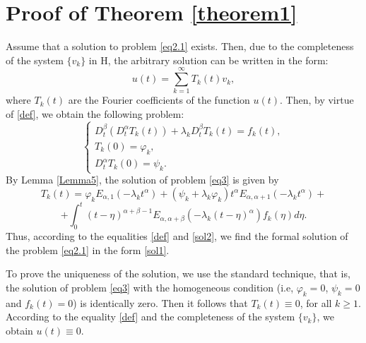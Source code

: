 \documentclass{amsart}
\numberwithin{equation}{section}
\begin{document}
\section{Proof of Theorem \ref{theorem1}}
Assume that a solution to problem \eqref{eq2.1} exists. Then, due to the completeness of the system $\{v_k\}$ in H, the arbitrary solution can be written in the form:
\begin{equation}\label{def}
u(t)=\sum_{k=1}^\infty T_k(t)v_k,
\end{equation}
where  $T_k(t)$ are the Fourier coefficients of the function $u(t)$. Then, by virtue  of \eqref{def}, we obtain the following problem:
\begin{equation}\label{eq3}
    \begin{cases}
    D_t^\beta(D_t^\alpha T_k(t))+\lambda_k D_t^\beta T_k(t)=f_k(t), \\
    T_k(0)=\varphi_k,  \\
    D_t^\alpha T_k(0)=\psi_k.
    \end{cases}
\end{equation}
By Lemma \ref{Lemma5}, the solution of problem \eqref{eq3} is given by
$$
 T_k(t)= \varphi_k E_{\alpha,1}(-\lambda_k t^\alpha)+(\psi_k+\lambda_k \varphi_k)t^\alpha E_{\alpha,\alpha+1}(-\lambda_k t^\alpha)+
$$
\begin{equation}\label{sol2}
    +\int_0^t (t-\eta)^{\alpha+\beta-1} E_{\alpha,\alpha+\beta}(-\lambda_k (t-\eta)^\alpha)f_k(\eta) d\eta.
\end{equation}
Thus, according to the equalities \eqref{def} and \eqref{sol2}, we find the formal solution of the problem \eqref{eq2.1} in the form \eqref{sol1}.

To prove the uniqueness of the solution, we use the standard technique, that is, the solution of problem \eqref{eq3} with the homogeneous condition (i.e, $\varphi_k=0$, $\psi_k=0$ and $f_k(t)=0$)  is identically zero. Then it follows that $T_k(t)\equiv0$, for all $k\geq1$. According to the equality  \eqref{def} and the completeness of the system $\{v_k\}$, we obtain $u(t)\equiv0$.
\end{document}
